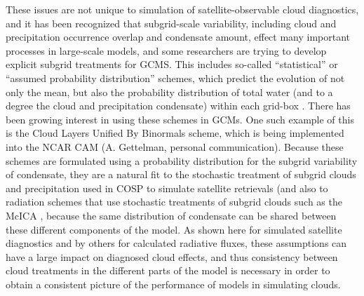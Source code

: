 These issues are not unique to simulation of satellite-observable cloud
diagnostics, and it has been recognized that subgrid-scale variability,
including cloud and precipitation occurrence overlap and condensate
amount, effect many important processes in large-scale models, and some
researchers are trying to develop explicit subgrid treatments for GCMS.
This includes so-called ``statistical'' or ``assumed probability
distribution'' schemes, which predict the evolution of not only the
mean, but also the probability distribution of total water (and to a
degree the cloud and precipitation condensate) within each grid-box
\citep[e.g.;][]{tompkins_2002}. There has been growing interest in using
these schemes in GCMs. One such example of this is the Cloud Layers
Unified By Binormals \citep[CLUBB;][]{golaz_et_al_2002} scheme, which is
being implemented into the NCAR CAM (A. Gettelman, personal
communication). Because these schemes are formulated using a probability
distribution for the subgrid variability of condensate, they are a
natural fit to the stochastic treatment of subgrid clouds and
precipitation used in COSP to simulate satellite retrievals (and also to
radiation schemes that use stochastic treatments of subgrid clouds such
as the McICA \citep{pincus_et_al_2003}, because the same distribution of
condensate can be shared between these different components of the
model. As shown here for simulated satellite diagnostics and by others
for calculated radiative fluxes, these assumptions can have a large
impact on diagnosed cloud effects, and thus consistency between cloud
treatments in the different parts of the model is necessary in order to
obtain a consistent picture of the performance of models in simulating
clouds.
